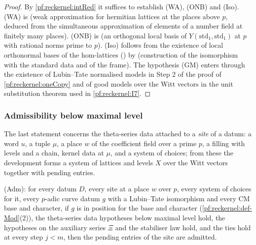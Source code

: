 \begin{proof}
By \cref{pf:reckernel:intRed} it suffices to establish \textup{(WA)}, \textup{(ONB)} and \textup{(Iso)}. \textup{(WA)} is
 (weak approximation for hermitian lattices at the places above
$p$, deduced from the simultaneous approximation of elements of a number field at finitely many places). \textup{(ONB)} is
 (an orthogonal local basis of $Y(\mathrm{std}_1,\mathrm{std}_1)$ at $p$
with rational norms prime to $p$). \textup{(Iso)} follows from the existence of local orthonormal bases of the hom-lattices
() by
 (construction of the isomorphism with the standard data and of the frame).
The hypothesis \textup{(GM)} enters through the existence of Lubin--Tate normalised models in Step 2 of the proof of
\cref{pf:reckernel:oneCopy} and of good models over the Witt vectors in the unit substitution theorem used in
\ref{pf:reckernel:I7}.
\end{proof}

\subsubsection{Admissibility below maximal level}
The last statement concerns the theta-series data attached to a \emph{site} of a datum: a word $u$, a tuple $\mu$, a
place $w$ of the coefficient field over a prime $p$, a filling with levels and a chain, kernel data at $\mu$, and a
system of choices; from these the development forms a system of lattices and levels $X$ over the Witt vectors
together with pending entries.

\begin{definition}\label{pf:reckernel:def-adm}
\textup{(Adm)}: for every datum $D$, every site at a place $w$ over $p$, every system of choices for it, every $p$-adic
curve datum $g$ with a Lubin--Tate isomorphism and every CM base and character, if $g$ is in position for the base and
character (\cref{pf:reckernel:def-Mod}(2)), the theta-series data hypotheses below maximal level hold, the hypotheses
on the auxiliary series $\Xi$ and the stabiliser law hold, and the ties hold at every step $j<m$, then the pending
entries of the site are admitted.
\end{definition}

